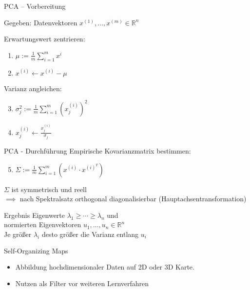 \documentclass[xcolor={dvipsnames,svgnames},draft]{beamer}
\begin{document}
\begin{frame}{PCA -- Vorbereitung}

  Gegeben: Datenvektoren $x^{(1)},\ldots,x^{(m)} \in \mathbb{R}^n$
  \vspace{1em}

  Erwartungswert zentrieren:
  
  \begin{enumerate}
  \item $\mu := \frac{1}{m}\sum_{i=1}^m x^{i}$
  \item $x^{(i)} \leftarrow x^{(i)} - \mu$
  \end{enumerate}

  Varianz angleichen:

  \begin{enumerate}
  \setcounter{enumi}{2}
  \item $\sigma_j^2 := \frac{1}{m}\sum_{i=1}^m{(x_j^{(i)})}^2$
  \item $x_j^{(i)} \leftarrow \frac{x_j^{(i)}}{\sigma_j}$
  \end{enumerate}

\end{frame}

\begin{frame}{PCA - Durchführung}
  Empirische Kovarianzmatrix bestimmen:

  \begin{enumerate}
  \setcounter{enumi}{4}
  \item $\Sigma := \frac{1}{m}\sum_{i=1}^m (x^{(i)} \cdot x^{(i)^T})$
  \end{enumerate}

  $\Sigma$ ist symmetrisch und reell \\
  $\implies$ nach Spektralsatz orthogonal diagonalisierbar
  (Hauptachsentransformation)

  \begin{block}{Ergebnis}
    Eigenwerte $\lambda_1 \geq \cdots \geq \lambda_n$ und \\
    normierten Eigenvektoren $u_1,\ldots,u_n \in \mathbb{R}^n$ \\
    Je größer $\lambda_i$ desto größer die Varianz entlang $u_i$
  \end{block}
\end{frame}

\begin{frame}{Self-Organizing Maps}

  \begin{itemize}
  \item Abbildung hochdimensionaler Daten auf 2D oder 3D Karte.
  \item Nutzen als Filter vor weiteren Lernverfahren
  \end{itemize}
  
\end{frame}
\end{document}
